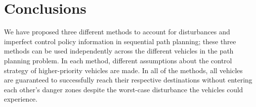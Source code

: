 \section{Conclusions}
We have proposed three different methods to account for disturbances and imperfect control policy information in sequential path planning; these three methods can be used independently across the different vehicles in the path planning problem. In each method, different assumptions about the control strategy of higher-priority vehicles are made. In all of the methods, all vehicles are guaranteed to successfully reach their respective destinations without entering each other's danger zones despite the worst-case disturbance the vehicles could experience. %